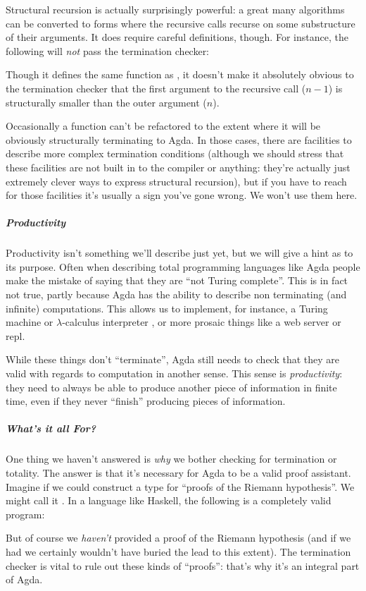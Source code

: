 Structural recursion is actually surprisingly powerful: a great many algorithms
can be converted to forms where the recursive calls recurse on some substructure
of their arguments.
It does require careful definitions, though.
For instance, the following will \emph{not} pass the termination checker:
\begin{agdalisting*}
\end{agdalisting*}
Though it defines the same function as , it doesn't make
it absolutely obvious to the termination checker that the first argument to the
recursive call (\(n - 1\)) is structurally smaller than the outer argument
(\(n\)).

Occasionally a function can't be refactored to the extent where it will be
obviously structurally terminating to Agda.
In those cases, there are facilities to describe more complex termination
conditions (although we should stress that these facilities are not
built in to the compiler or anything: they're actually just extremely clever
ways to express structural recursion), but if you have to reach for those
facilities it's usually a sign you've gone wrong.
We won't use them here.
\subparagraph{Productivity}
Productivity isn't something we'll describe just yet, but we will give a hint as
to its purpose.
Often when describing total programming languages like Agda people make the
mistake of saying that they are ``not Turing complete''.
This is in fact not true, partly because Agda has the ability to describe non
terminating (and infinite) computations.
This allows us to implement, for instance, a Turing machine or
\(\lambda\)-calculus interpreter
\citep{mcbrideTuringCompletenessTotallyFree2015}, or more prosaic things like a
web server or repl.

While these things don't ``terminate'', Agda still needs to check that they are
valid with regards to computation in another sense.
This sense is \emph{productivity}: they need to always be able to produce
another piece of information in finite time, even if they never ``finish''
producing pieces of information.
\subparagraph{What's it all For?}
One thing we haven't answered is \emph{why} we bother checking for termination
or totality.
The answer is that it's necessary for Agda to be a valid proof assistant.
Imagine if we could construct a type for ``proofs of the Riemann hypothesis''.
We might call it .
In a language like Haskell, the following is a completely valid program:
\begin{agdalisting*}
\end{agdalisting*}
But of course we \emph{haven't} provided a proof of the Riemann hypothesis (and
if we had we certainly wouldn't have buried the lead to this extent).
The termination checker is vital to rule out these kinds of ``proofs'': that's
why it's an integral part of Agda.
